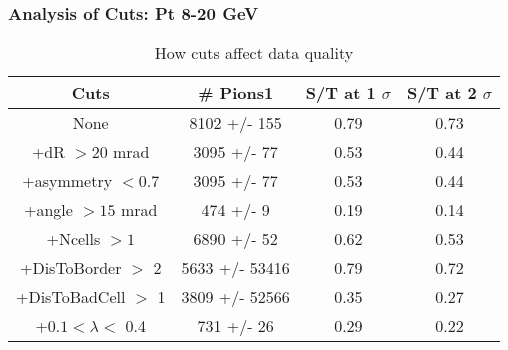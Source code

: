 \frame
{
\frametitle{Analysis of Cuts: Pt 8-20 GeV}
\begin{table}
\caption{How cuts affect data quality}
\centering
\begin{tabular}{c c c c}
\hline\hline
Cuts & \# Pions1 & S/T at 1 $\sigma$ & S/T at 2 $\sigma$ \\ [0.5ex]
\hline
None & 8102 +/-  155 & 0.79 & 0.73 \\ %
+dR $> 20$ mrad & 3095 +/-   77 & 0.53 & 0.44 \\ %
+asymmetry $< 0.7$ & 3095 +/-   77 & 0.53 & 0.44 \\ %
+angle $> 15$ mrad &  474 +/-    9 & 0.19 & 0.14 \\ %
+Ncells $> 1$& 6890 +/-   52 & 0.62 & 0.53 \\ %
+DisToBorder $>$ 2 & 5633 +/- 53416 & 0.79 & 0.72 \\ %
+DisToBadCell $>$ 1& 3809 +/- 52566 & 0.35 & 0.27 \\ %
+$0.1 < \lambda <$ 0.4 &  731 +/-   26 & 0.29 & 0.22 \\ %
[1ex]
\hline
\end{tabular}
\label{table:nonlin}
\end{table}
}
